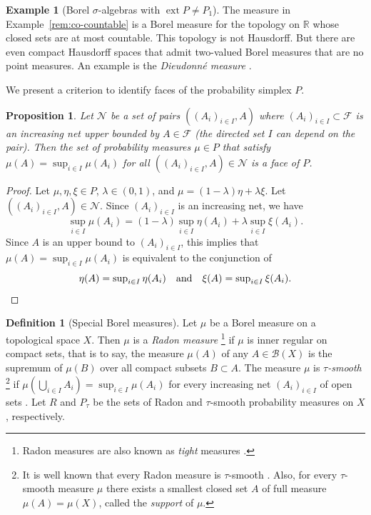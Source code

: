 \documentclass[a4paper,11pt,reqno]{amsart}
\numberwithin{equation}{section}
\theoremstyle{plain}
\newtheorem{proposition}[theorem]{Proposition}
\theoremstyle{definition}
\newtheorem{definition}[theorem]{Definition}
\newtheorem{example}[theorem]{Example}
\newcommand{\cB}{\mathcal{B}} %
\newcommand{\cF}{\mathcal{F}} %
\newcommand{\cN}{\mathcal{N}} %
\newcommand{\R}{\mathbb{R}} %
\DeclareMathOperator{\ext}{ext} %
\begin{document}
%
\begin{example}[Borel $\sigma$-algebras with $\ext P\neq P_1$]
The measure in Example~\ref{rem:co-countable} is a Borel measure for the topology on $\R$ 
whose closed sets are at most countable. This topology is not Hausdorff. But there are even 
compact Hausdorff spaces that admit two-valued Borel measures that are no point measures. 
An example is the \emph{Dieudonn\'{e} measure} \cite[Example~7.1.3]{bogachev07-vol2}. 
\end{example}
%
We present a criterion to identify faces of the probability simplex $P$.
\par
%
\begin{proposition}\label{pro:face-crit}
Let $\cN$ be a set of pairs $((A_i)_{i\in I},A)$ where $(A_i)_{i\in I}\subset\cF$ 
is an increasing net upper bounded by $A\in\cF$ (the directed set $I$ can 
depend on the pair). Then the set of probability measures $\mu\in P$ that satisfy 
$\mu(A)=\sup_{i\in I}\mu(A_i)$ for all $((A_i)_{i\in I},A)\in\cN$ is a face of $P$.
\end{proposition}
%
\begin{proof}
Let $\mu,\eta,\xi\in P$, $\lambda\in(0,1)$, and $\mu=(1-\lambda)\eta+\lambda\xi$. 
Let $((A_i)_{i\in I},A)\in\cN$. Since $(A_i)_{i\in I}$ is an increasing net, we
have
\[\textstyle
\sup_{i\in I}\mu(A_i)
=(1-\lambda)\sup_{i\in I}\eta(A_i)
+\lambda\sup_{i\in I}\xi(A_i).
\]
Since $A$ is an upper bound to $(A_i)_{i\in I}$, this implies that 
$\mu(A)=\sup_{i\in I}\mu(A_i)$ is equivalent to the conjunction of 
\[\textstyle
\eta(A)=\sup_{i\in I}\eta(A_i) 
\quad\text{and}\quad 
\xi(A)=\sup_{i\in I}\xi(A_i).
\qedhere
\]
\end{proof}
%
\begin{definition}[Special Borel measures]\label{def:spec-Borel}
Let $\mu$ be a Borel measure on a topological space $X$. Then $\mu$ is a 
\emph{Radon measure}%
%
\footnote{Radon measures are also known as \emph{tight} measures \cite{topsoe70}.}
%
\cite{schwartz73} if $\mu$ is inner regular on compact sets, that is to say, the 
measure $\mu(A)$ of any $A\in\cB(X)$ is the supremum of $\mu(B)$ over all compact 
subsets $B\subset A$. The measure $\mu$ is \emph{$\tau$-smooth}%
%
\footnote{It is well known that every Radon measure is $\tau$-smooth
\cite[Proposition~7.2.9]{bogachev07-vol2}. Also, for every $\tau$-smooth 
measure $\mu$ there exists a smallest closed set $A$ of full measure 
$\mu(A)=\mu(X)$, called the \emph{support} of $\mu$.}
%
if $\mu(\bigcup_{i\in I}A_i)=\sup_{i\in I}\mu(A_i)$ for every increasing net 
$(A_i)_{i\in I}$ of open sets \cite{topsoe70,winkler85}. Let $R$ and $P\!_\tau$
be the sets of Radon and $\tau$-smooth probability measures on $X$, respectively.
\end{definition}
\end{document}
